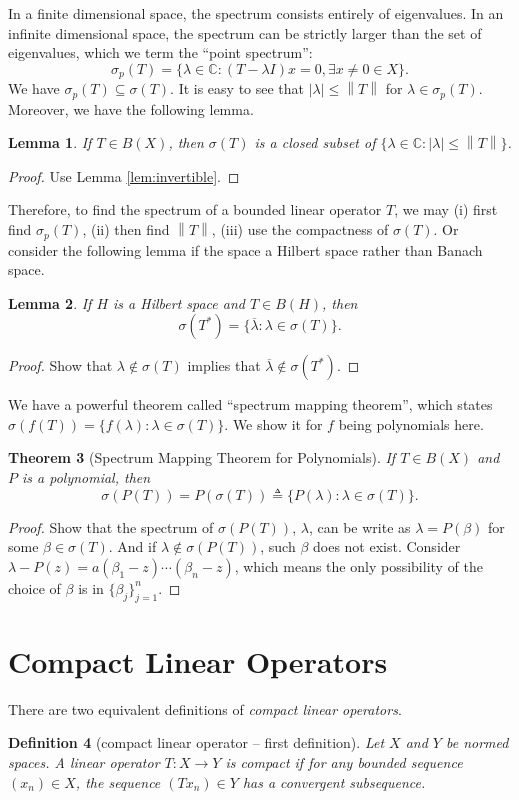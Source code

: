 \documentclass[12pt,a4paper]{report}
\numberwithin{equation}{section}
\theoremstyle{mystyle}
\newtheorem{definition}{Definition}[section]
\newtheorem{theorem}[definition]{Theorem}
\newtheorem{lemma}[definition]{Lemma}
\newcommand{\C}{\mathbb{C}}
\newcommand{\norm}[1]{\left\lVert #1 \right\rVert}
\begin{document}
	In a finite dimensional space, the spectrum consists entirely of eigenvalues. In an infinite dimensional space, the spectrum can be strictly larger than the set of eigenvalues, which we term the ``point spectrum'':
	$$
	\sigma_p(T)=\{\lambda\in \C: (T-\lambda I)x=0,\exists x\neq 0\in X\}.
	$$
	We have $\sigma_p(T)\subseteq \sigma(T)$. It is easy to see that $|\lambda|\leq \norm{T}$ for $\lambda \in \sigma_p(T)$. Moreover, we have the following lemma.
	\begin{lemma}
		If $T\in B(X)$, then $\sigma(T)$ is a closed subset of $\{\lambda\in \C:|\lambda|\leq \norm{T} \}$.
	\end{lemma}
	\begin{proof}
		Use Lemma \ref{lem:invertible}.
	\end{proof}
	Therefore, to find the spectrum of a bounded linear operator $T$, we may (i) first find $\sigma_p(T)$, (ii) then find $\norm{T}$, (iii) use the compactness of $\sigma(T)$. Or consider the following lemma if the space a Hilbert space rather than Banach space.
	\begin{lemma}
		If $H$ is a Hilbert space and $T\in B(H)$, then
		$$
		\sigma(T^*)=\{\overline{\lambda}:\lambda\in \sigma(T)\}.
		$$
	\end{lemma}
	\begin{proof}
		Show that $\lambda\notin \sigma(T)$ implies that $\overline{\lambda}\notin \sigma(T^*)$.
	\end{proof}
	
	We have a powerful theorem called ``spectrum mapping theorem'', which states $\sigma(f(T))=\{f(\lambda):\lambda\in \sigma(T)\}$. We show it for $f$ being polynomials here.
	\begin{theorem}[Spectrum Mapping Theorem for Polynomials]
		If $T\in B(X)$ and $P$ is a polynomial, then
		$$
		\sigma(P(T))=P(\sigma(T))\triangleq\{P(\lambda):\lambda\in \sigma(T)\}.
		$$
	\end{theorem}
	\begin{proof}
		Show that the spectrum of $\sigma(P(T))$, $\lambda$, can be write as $\lambda=P(\beta)$ for some $\beta\in \sigma(T)$. And if $\lambda\notin \sigma(P(T))$, such $\beta$ does not exist. Consider $\lambda-P(z)=a(\beta_1-z)\cdots(\beta_n-z)$, which means the only possibility of the choice of $\beta$ is in $\{\beta_j\}_{j=1}^n$.
	\end{proof}
	
	
	\section{Compact Linear Operators}
	There are two equivalent definitions of \emph{compact linear operators}.
	\begin{definition}[compact linear operator -- first definition]
		Let $X$ and $Y$ be normed spaces. A linear operator $T: X\to Y$ is \emph{compact} if for any bounded sequence $(x_n)\in X$, the sequence $(Tx_n)\in Y$ has a convergent subsequence.
	\end{definition}
\end{document}
